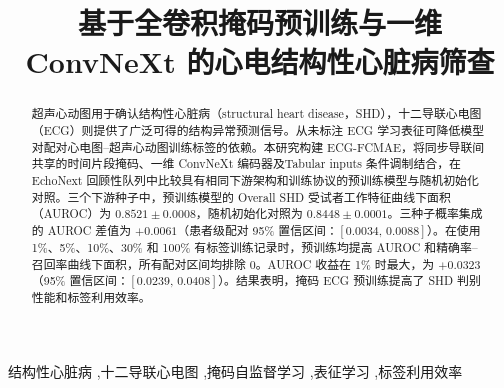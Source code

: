 \documentclass[final,5p,times,twocolumn,nonatbib]{elsarticle}
\begin{document}
\begin{frontmatter}

\title{基于全卷积掩码预训练与一维 ConvNeXt 的心电结构性心脏病筛查}

\begin{abstract}
超声心动图用于确认结构性心脏病（structural heart disease，SHD），十二导联心电图（ECG）则提供了广泛可得的结构异常预测信号。从未标注 ECG 学习表征可降低模型对配对心电图--超声心动图训练标签的依赖。本研究构建 ECG-FCMAE，将同步导联间共享的时间片段掩码、一维 ConvNeXt 编码器及Tabular inputs 条件调制结合，在 EchoNext 回顾性队列中比较具有相同下游架构和训练协议的预训练模型与随机初始化对照。三个下游种子中，预训练模型的 Overall SHD 受试者工作特征曲线下面积（AUROC）为 $0.8521\pm0.0008$，随机初始化对照为 $0.8448\pm0.0001$。三种子概率集成的 AUROC 差值为 $+0.0061$（患者级配对 95\% 置信区间：$[0.0034,\,0.0088]$）。在使用 1\%、5\%、10\%、30\% 和 100\% 有标签训练记录时，预训练均提高 AUROC 和精确率--召回率曲线下面积，所有配对区间均排除 0。AUROC 收益在 1\% 时最大，为 $+0.0323$（95\% 置信区间：$[0.0239,\,0.0408]$）。结果表明，掩码 ECG 预训练提高了 SHD 判别性能和标签利用效率。
\end{abstract}

\begin{keyword}
结构性心脏病 \sep 十二导联心电图 \sep 掩码自监督学习 \sep 表征学习 \sep 标签利用效率
\end{keyword}

\end{frontmatter}
\raggedbottom



\BSPCprintbibliography
\end{document}
